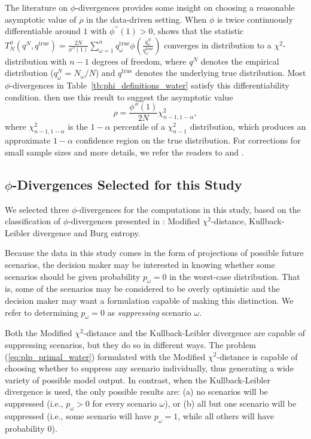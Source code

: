 \documentclass[11pt]{article}
\newcommand{\qtrue}{q^{\text{true}}}
\theoremstyle{plain}
\theoremstyle{definition}
\theoremstyle{remark}
\begin{document}
The literature on $\phi$-divergences provides some insight on choosing a reasonable asymptotic value of $\rho$ in the data-driven setting. 
When $\phi$ is twice continuously differentiable around $1$ with $\phi^{\prime \prime}(1)>0$, \citet[Theorem 3.1]{pardo2005statistical} shows that the statistic $T^\phi_N(q^N,\qtrue) = \frac{2N}{\phi''(1)} \sum_{\omega=1}^n \qtrue_\omega \phi\left(\frac{q^N_\omega}{\qtrue_\omega}\right)$ converges in distribution to a $\chi^2$-distribution with $n-1$ degrees of freedom, where $q^N$ denotes the empirical distribution ($q^N_\omega = N_\omega/N$) and $\qtrue$ denotes the underlying true distribution.
Most $\phi$-divergences in Table~\ref{tb:phi_definitions_water} satisfy this differentiability condition.
\citet{bental2011robust} then use this result to suggest the asymptotic value
\begin{equation} \label{eq:asymptotic_rho_water}
	\rho = \frac{\phi''(1)}{2N} \chi^2_{n-1,1-\alpha},
\end{equation}
where $\chi^2_{n-1,1-\alpha}$ is the $1-\alpha$ percentile of a $\chi^2_{n-1}$ distribution, which produces an approximate $1-\alpha$ confidence region on the true distribution.
For corrections for small sample sizes and more details, we refer the readers to \citep{pardo2005statistical} and \citep{bental2011robust}.


\subsection{$\phi$-Divergences Selected for this Study}
\label{ssec:classification}

We selected three $\phi$-divergences for the computations in this study, based on the classification of $\phi$-divergences presented in \citep{love2013phi}: Modified $\chi^2$-distance, Kullback-Leibler divergence and Burg entropy.

Because the data in this study comes in the form of projections of possible future scenarios, the decision maker may be interested in knowing whether some scenarios should be given probability $p_\omega = 0$ in the worst-case distribution.
That is, some of the scenarios may be considered to be overly optimistic and the decision maker may want a formulation capable of making this distinction.
We refer to determining $p_\omega = 0$ as \emph{suppressing} scenario $\omega$.

Both the Modified $\chi^2$-distance and the Kullback-Leibler divergence are capable of suppressing scenarios, but they do so in different ways.
The problem (\ref{eq:plp_primal_water}) formulated with the Modified $\chi^2$-distance is capable of choosing whether to suppress any scenario individually, thus generating a wide variety of possible model output.
In contrast, when the Kullback-Leibler divergence is used, the only possible results are: (a) no scenarios will be suppressed (i.e., $p_\omega > 0$ for every scenario $\omega$), or (b) all but one scenario will be suppressed (i.e., some scenario will have $p_\omega = 1$, while all others will have probability 0).
\end{document}
